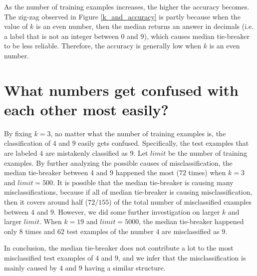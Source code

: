 \documentclass[11pt]{article}
\begin{document}
As the number of training examples increases, the higher the accuracy becomes.
The zig-zag observed in Figure \ref{k_and_accuracy} is partly because when the value of $k$ is an even number, then the median returns an answer in decimals (i.e. a label that is not an integer between $0$ and $9$), which causes median tie-breaker to be less reliable. Therefore, the accuracy is generally low when $k$ is an even number.


\section{What numbers get confused with each other most easily?}

By fixing $k = 3$, no matter what the number of training examples is, the classification of $4$ and $9$ easily gets confused. 
Specifically, the test examples that are labeled $4$ are mistakenly classified as $9$.
Let $limit$ be the number of training examples. 
By further analyzing the possible causes of misclassification, the median tie-breaker between $4$ and $9$ happened the most ($72$ times) when $k = 3$ and $limit = 500$. 
It is possible that the median tie-breaker is causing many misclassifications, because if all of median tie-breaker is causing misclassification, then it covers around half ($72/155$) of the total number of misclassified examples between $4$ and $9$. 
However, we did some further investigation on larger $k$ and larger $limit$. 
When $k = 19$ and $limit = 5000$, the median tie-breaker happened only $8$ times and $62$ test examples of the number $4$ are misclassified as $9$.

In conclusion, the median tie-breaker does not contribute a lot to the most misclassified test examples of $4$ and $9$, and we infer that the misclassification is mainly caused by $4$ and $9$ having a similar structure.
\end{document}
